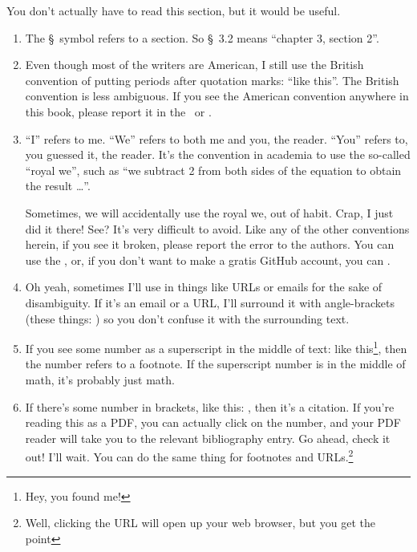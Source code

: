 
You don't actually have to read this section, but it would be useful.

\begin{enumerate}
  \item The \S\ symbol refers to a section. So \S\ 3.2 means ``chapter 3,
    section 2''.
  \item Even though most of the writers are American, I still use the British
    convention of putting periods after quotation marks: ``like this''. The
    British convention is less ambiguous. If you see the American convention
    anywhere in this book, please report it in the \bugtracker\ or \emailme .
  \item ``I'' refers to me. ``We'' refers to both me and you, the
    reader. ``You'' refers to, you guessed it, the reader. It's the convention
    in academia to use the so-called ``royal we'', such as ``we subtract 2 from
    both sides of the equation to obtain the result \dots''.

    Sometimes, we will accidentally use the royal we, out of habit. Crap, I just
    did it there! See? It's very difficult to avoid. Like any of the other
    conventions herein, if you see it broken, please report the error to the
    authors. You can use the \bugtracker, or, if you don't want to make a gratis
    GitHub account, you can \emailme.

  \item Oh yeah, sometimes I'll use  in things like URLs or
    emails for the sake of disambiguity. If it's an email or a URL, I'll
    surround it with angle-brackets (these things: \code{<>}) so you don't
    confuse it with the surrounding text.

  \item If you see some number as a superscript in the middle of text: like
    this\footnote{Hey, you found me!}, then the number refers to a footnote. If
    the superscript number is in the middle of math, it's probably just math.

  \item If there's some number in brackets, like this: \cite{lyah}, then it's a
    citation. If you're reading this as a PDF, you can actually click on the
    number, and your PDF reader will take you to the relevant bibliography
    entry. Go ahead, check it out! I'll wait. You can do the same thing for
    footnotes and URLs.\footnote{Well, clicking the URL will open up your web
      browser, but you get the point}


\end{enumerate}
